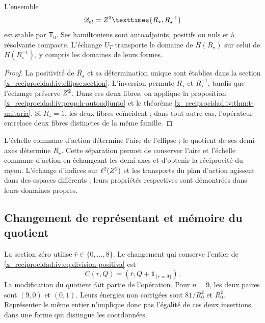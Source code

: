 \begin{corollary}
\label{x_reciprocidad:iv:cor:radio-especializado}
L'ensemble
\[
 \mathscr D_{\mathrm{el}}
 =\ZZ^2\times\{R_\star,R_\star^{-1}\}
\]
est stable par \(\mathsf T_0\). Ses hamiltoniens sont autoadjoints,
positifs ou nuls et à résolvante compacte. L’échange \(U_T\)
transporte le domaine de \(H(R_\star)\) sur celui de
\(H(R_\star^{-1})\), y compris les domaines de leurs formes.
\end{corollary}
\begin{proof}
La positivité de \(R_\star\) et sa détermination unique sont établies
dans la section \ref{x_reciprocidad:iv:ellipse:section}. L’inversion permute
\(R_\star\) et \(R_\star^{-1}\), tandis que l’échange préserve
\(Z^2\). Dans ces deux fibres, on applique la proposition
\ref{x_reciprocidad:iv:prop:h-autoadjunto} et le théorème \ref{x_reciprocidad:iv:thm:t-unitaria}.
Si \(R_\star=1\), les deux fibres coïncident ; dans tout autre cas,
l’opérateur entrelace deux fibres distinctes de la même famille.
\end{proof}

L’échelle commune d’action détermine l’aire de l’ellipse ; le quotient
de ses demi-axes détermine \(R_\star\). Cette séparation permet de conserver
l’aire et l’échelle commune d’action en échangeant les demi-axes et d’obtenir la réciprocité
du rayon. L’échange d’indices sur \(\ell^2(Z^2)\)
et les transports du plan d’action agissent dans des espaces différents ;
leurs propriétés respectives sont démontrées dans leurs domaines propres.

\subsection{Changement de représentant et mémoire du quotient}

La section zéro utilise \(\bar r\in\{0,\ldots,8\}\). Le changement
qui conserve l’entier de \eqref{x_reciprocidad:iv:eq:division-positiva} est
\begin{equation}
 C(r,Q)=(\bar r,Q+\mathbf1_{\{r=9\}}).
 \label{x_reciprocidad:iv:eq:cambio-seccion}
\end{equation}
La modification du quotient fait partie de l’opération.
Pour \(n=9\), les deux paires sont \((9,0)\) et \((0,1)\).
Leurs énergies non corrigées sont \(81/R_0^2\) et \(R_0^2\).
Représenter le même entier n’implique donc pas l’égalité de
ces deux insertions dans une forme qui distingue les coordonnées.

